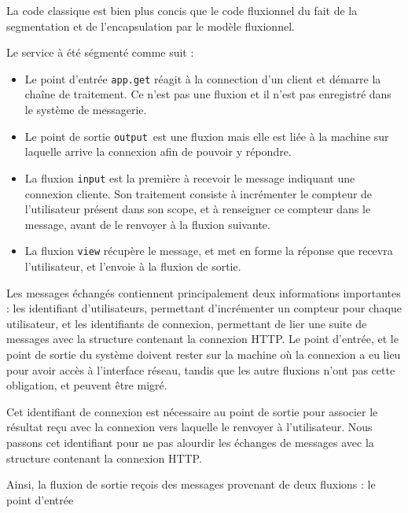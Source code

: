 La code classique est bien plus concis que le code fluxionnel du fait de la segmentation et de l'encapsulation  par le modèle fluxionnel.

Le service à été ségmenté comme suit :
\begin{itemize}
  \item Le point d'entrée \texttt{app.get} réagit à la connection d'un client et démarre la chaîne de traitement.
  Ce n'est pas une fluxion et il n'est pas enregistré dans le système de messagerie.
  \item Le point de sortie \texttt{output} est une fluxion mais elle est liée à la machine sur laquelle arrive la connexion afin de pouvoir y répondre.
  \item La fluxion \texttt{input} est la première à recevoir le message indiquant une connexion cliente. Son traitement consiste à incrémenter le compteur de l'utilisateur présent dans son scope, et à renseigner ce compteur dans le message, avant de le renvoyer à la fluxion suivante.
  \item La fluxion \texttt{view} récupère le message, et met en forme la réponse que recevra l'utilisateur, et l'envoie à la fluxion de sortie.
\end{itemize}

Les messages échangés contiennent principalement deux informations importantes : les identifiant d'utilisateurs, permettant d'incrémenter un compteur pour chaque utilisateur, et les identifiants de connexion, permettant de lier une suite de messages avec la structure contenant la connexion HTTP.
Le point d'entrée, et le point de sortie du système doivent rester sur la machine où la connexion a eu lieu pour avoir accès à l'interface réseau, tandis que les autre fluxions n'ont pas cette obligation, et peuvent être migré.

Cet identifiant de connexion est nécessaire au point de sortie pour associer le résultat reçu avec la connexion vers laquelle le renvoyer à l'utilisateur.
Nous passons cet identifiant pour ne pas alourdir les échanges de messages avec la structure contenant la connexion HTTP.

Ainsi, la fluxion de sortie reçois des messages provenant de deux fluxions : le point d'entrée




